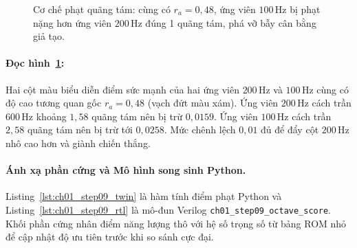 \begin{figure}[H]
\centering
{}
\caption{Cơ chế phạt quãng tám: cùng có $r_a = 0{,}48$, ứng viên $100\,\text{Hz}$ bị phạt nặng hơn ứng viên $200\,\text{Hz}$ đúng 1 quãng tám, phá vỡ bẫy cân bằng giả tạo.}
\label{fig:ch01_octave_cost}
\end{figure}

\paragraph{Đọc hình~\ref{fig:ch01_octave_cost}:}
Hai cột màu biểu diễn điểm sức mạnh của hai ứng viên $200\,\text{Hz}$ và $100\,\text{Hz}$ cùng có độ cao tương quan gốc $r_a = 0{,}48$ (vạch đứt màu xám). Ứng viên $200\,\text{Hz}$ cách trần $600\,\text{Hz}$ khoảng $1{,}58$ quãng tám nên bị trừ $0{,}0159$. Ứng viên $100\,\text{Hz}$ cách trần $2{,}58$ quãng tám nên bị trừ tới $0{,}0258$. Mức chênh lệch $0{,}01$ đủ để đẩy cột $200\,\text{Hz}$ nhô cao hơn và giành chiến thắng.

\paragraph{Ánh xạ phần cứng và Mô hình song sinh Python.}
Listing~\ref{lst:ch01_step09_twin} là hàm tính điểm phạt Python và Listing~\ref{lst:ch01_step09_rtl} là mô-đun Verilog \texttt{ch01\_step09\_octave\_score}. Khối phần cứng nhân điểm năng lượng thô với hệ số trọng số từ bảng ROM nhỏ để cập nhật độ ưu tiên trước khi so sánh cực đại.

